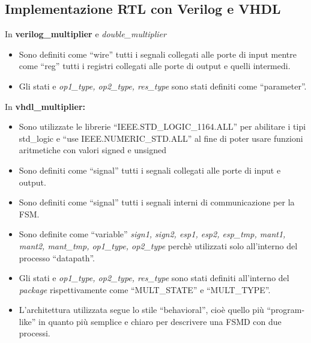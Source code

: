 \documentclass[]{IEEEtran}
\begin{document}
\subsection{Implementazione RTL con Verilog e VHDL}
In \textbf{verilog\_multiplier} e \textit{double\_multiplier}
\begin{itemize}
    \item Sono definiti come ``wire'' tutti i segnali collegati alle porte di input mentre come ``reg'' tutti i registri collegati alle porte di output e quelli intermedi.
    \item Gli stati e \textit{op1\_type, op2\_type, res\_type} sono stati definiti come ``parameter''.
\end{itemize}
In \textbf{vhdl\_multiplier:}
\begin{itemize}
    \item Sono utilizzate le librerie ``IEEE.STD\_LOGIC\_1164.ALL'' per abilitare i tipi std\_logic e ``use IEEE.NUMERIC\_STD.ALL'' al fine di poter usare funzioni aritmetiche con valori signed e unsigned
    \item Sono definiti come ``signal'' tutti i segnali collegati alle porte di input e output.
    \item Sono definiti come ``signal'' tutti i segnali interni di communicazione per la FSM.
    \item Sono definite come ``variable'' \textit{sign1, sign2, esp1, esp2, esp\_tmp, mant1, mant2, mant\_tmp, op1\_type, op2\_type} perchè utilizzati solo all'interno del processo ``datapath''.
    \item Gli stati e \textit{op1\_type, op2\_type, res\_type} sono stati definiti all'interno del \textit{package} rispettivamente come ``MULT\_STATE'' e ``MULT\_TYPE''.
    \item L'architettura utilizzata segue lo stile ``behavioral'', cioè quello più ``program-like'' in quanto più semplice e chiaro per descrivere una FSMD con due processi.
\end{itemize}
\end{document}
